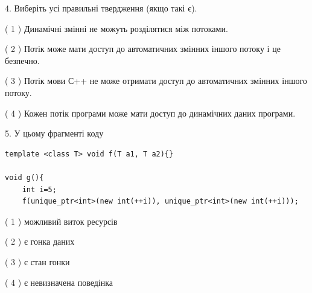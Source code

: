 \documentclass[12pt, ukrainian]{article}
\begin{document}
\begin {large}
{%
4. Виберіть усі правильні твердження (якщо такі є).\par
\vspace{2mm}

( 1 ) Динамічні змінні не можуть розділятися між потоками.%

( 2 ) Потік може мати доступ до автоматичних змінних іншого потоку і це безпечно.%

( 3 ) Потік мови С++ не може отримати доступ до автоматичних змінних іншого потоку.%

( 4 ) Кожен потік програми може мати доступ до динамічних даних програми.%


5. У цьому фрагменті коду
\begin{verbatim}
template <class T> void f(T a1, T a2){}

void g(){
    int i=5;
    f(unique_ptr<int>(new int(++i)), unique_ptr<int>(new int(++i)));
\end{verbatim}

( 1 ) можливий виток ресурсів%

( 2 ) є гонка даних%

( 3 ) є стан гонки%

( 4 ) є невизначена поведінка%
}
\end {large}
\end{document}
